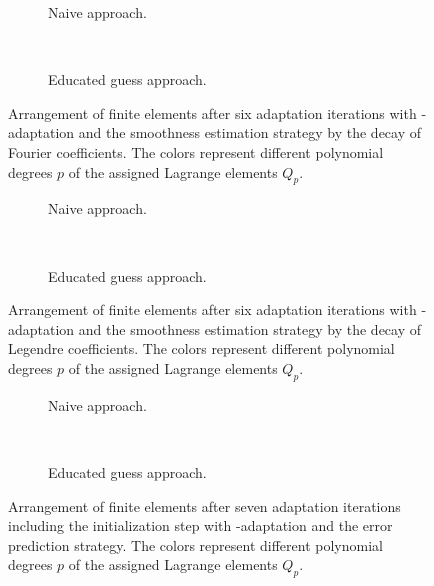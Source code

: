 \begin{figure}
\begin{subfigure}{1\textwidth}
  \centering
  
  \caption{Naive approach.}
\end{subfigure}
\vspace{1em}\\
\begin{subfigure}{1\textwidth}
  \centering
  
  \caption{Educated guess approach.}
\end{subfigure}
\caption[Arrangement of finite elements with \hp-adaptation and the Fourier coefficient decay strategy.]{Arrangement of finite elements after six adaptation iterations with \hp-adaptation and the smoothness estimation strategy by the decay of Fourier coefficients. The colors represent different polynomial degrees $p$ of the assigned Lagrange elements $Q_p$.}
\label{fig:meshfourier}
\end{figure}

\begin{figure}
\begin{subfigure}{1\textwidth}
  \centering
  
  \caption{Naive approach.}
\end{subfigure}
\vspace{1em}\\
\begin{subfigure}{1\textwidth}
  \centering
  
  \caption{Educated guess approach.}
\end{subfigure}
\caption[Arrangement of finite elements with \hp-adaptation and the Legendre coefficient decay strategy.]{Arrangement of finite elements after six adaptation iterations with \hp-adaptation and the smoothness estimation strategy by the decay of Legendre coefficients. The colors represent different polynomial degrees $p$ of the assigned Lagrange elements $Q_p$.}
\label{fig:meshlegendre}
\end{figure}

\begin{figure}
\begin{subfigure}{1\textwidth}
  \centering
  
  \caption{Naive approach.}
\end{subfigure}
\vspace{1em}\\
\begin{subfigure}{1\textwidth}
  \centering
  
  \caption{Educated guess approach.}
\end{subfigure}
\caption[Arrangement of finite elements with \hp-adaptation and the error prediction strategy.]{Arrangement of finite elements after seven adaptation iterations including the initialization step with \hp-adaptation and the error prediction strategy. The colors represent different polynomial degrees $p$ of the assigned Lagrange elements $Q_p$.}
\label{fig:meshprediction}
\end{figure}